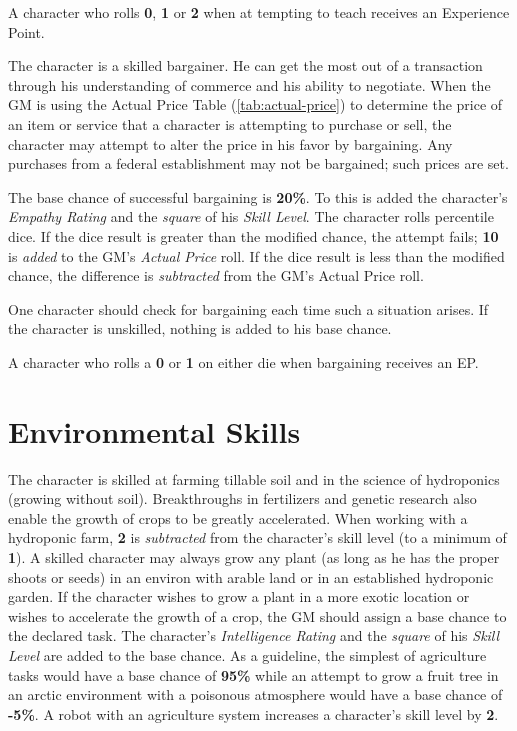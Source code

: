 A character who rolls \textbf{0}, \textbf{1} or \textbf{2} when at
tempting to teach receives an Experience Point.

\label{sec:skill-trading}

The character is a skilled bargainer.  He can get the most out of a
transaction through his understanding of commerce and his ability to
negotiate.  When the GM is using the Actual Price Table
(\ref{tab:actual-price}) to determine the price of an item or service
that a character is attempting to purchase or sell, the character may
attempt to alter the price in his favor by bargaining.  Any purchases
from a federal establishment may not be bargained; such prices are
set.

The base chance of successful bargaining is \textbf{20\%}.  To this is
added the character's \emph{Empathy Rating} and the \emph{square} of
his \emph{Skill Level}.  The character rolls percentile dice.  If the
dice result is greater than the modified chance, the attempt fails;
\textbf{10} is \emph{added} to the GM's \emph{Actual Price} roll.  If the
dice result is less than the modified chance, the difference is
\emph{subtracted} from the GM's Actual Price roll.

One character should check for bargaining each time such a situation
arises.  If the character is unskilled, nothing is added to his base
chance.

A character who rolls a \textbf{0} or \textbf{1} on either die when
bargaining receives an EP.

\section{Environmental Skills}
\label{sec:environmental-skills}

\label{sec:skill-agriculture}

The character is skilled at farming tillable soil and in the science
of hydroponics (growing without soil).  Breakthroughs in fertilizers
and genetic research also enable the growth of crops to be greatly
accelerated.  When working with a hydroponic farm, \textbf{2} is
\emph{subtracted} from the character's skill level (to a minimum of
\textbf{1}).  A skilled character may always grow any plant (as long
as he has the proper shoots or seeds) in an environ with arable land
or in an established hydroponic garden.  If the character wishes to
grow a plant in a more exotic location or wishes to accelerate the
growth of a crop, the GM should assign a base chance to the declared
task.  The character's \emph{Intelligence Rating} and the
\emph{square} of his \emph{Skill Level} are added to the base chance.
As a guideline, the simplest of agriculture tasks would have a base
chance of \textbf{95\%} while an attempt to grow a fruit tree in an
arctic environment with a poisonous atmosphere would have a base
chance of \textbf{-5\%}.  A robot with an agriculture system increases
a character's skill level by \textbf{2}.

